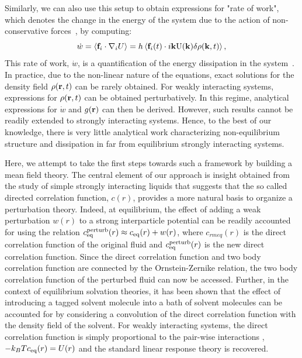 \documentclass[amsmath,preprintnumbers,10pt,nofootinbib,prl,twocolumn]{revtex4-1}
\newcommand{\U}{\text{U}}
\begin{document}
Similarly, we can also use this setup to obtain expressions for "rate of work", which denotes the change in the energy of the system due to the action of non-conservative forces~\cite{Suri2019,Suri2020,delJunco_2018}, by computing:
\begin{equation}\label{eq:wdot}
    \dot{w} = \langle {\bf f}_i \cdot \nabla_i U  \rangle = h \left \langle {\bf f}_i(t) \cdot i{\bf k} \U({\bf k}) \delta \rho({\bf k}, t) \right \rangle,
\end{equation}
This rate of work, $\dot{w}$, is a quantification of the energy dissipation in the system~\cite{Suri2019}. In practice, due to the non-linear nature of the equations, exact solutions for the density field $\rho({\bf r} , t)$ can be rarely obtained. For weakly interacting systems, expressions for $\rho({\bf r} , t)$ can be obtained perturbatively. In this regime, analytical expressions for $\dot{w}$ and $g({\bf r} )$ can then be derived. However, such results cannot be readily extended to strongly interacting systems. Hence, to the best of our knowledge, there is very little analytical work characterizing non-equilibrium structure and dissipation in far from equilibrium strongly interacting systems. 

Here, we attempt to take the first steps towards such a framework by building a mean field theory. The central element of our approach is insight obtained from the study of simple strongly interacting liquids that suggests that the so called directed correlation function, $c(r)$, provides a more natural basis to organize a perturbation theory. Indeed, at equilibrium, the effect of adding a weak perturbation $w(r)$ to a strong interparticle potential can be readily accounted for using the relation $c_{\rm eq}^{\rm perturb}(r) \approx c_{\rm eq}(r) + w(r)$, where $c_{rm eq}(r)$ is the direct correlation function of the original fluid and $c_{\rm eq}^{\rm perturb}(r)$ is the new direct correlation function. Since the direct correlation function and two body correlation function are connected by the Ornstein-Zernike relation, the two body correlation function of the perturbed fluid can now be accessed. Further, in the context of equilibrium solvation theories, it has been shown that the effect of introducing a tagged solvent molecule into a bath of solvent molecules can be accounted for by considering a convolution of the direct correlation function with the density field of the solvent. For weakly interacting systems, the direct correlation function is simply proportional to the pair-wise interactions , $-k_B T c_{\rm eq}(r)=U(r)$ and the standard linear response theory is recovered. 
\end{document}
